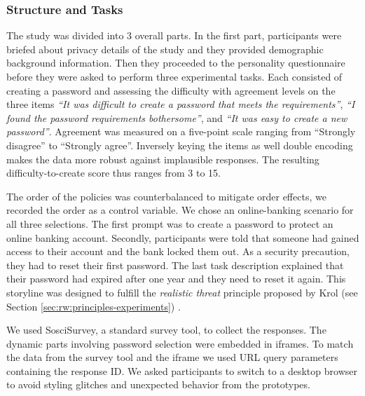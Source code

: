 \subsubsection{Structure and Tasks}
The study was divided into 3 overall parts. In the first part, participants were briefed about privacy details of the study and they provided demographic background information. Then they proceeded to the personality questionnaire before they were asked to perform three experimental tasks. Each consisted of creating a password and assessing the difficulty with agreement levels on the three items \textit{``It was difficult to create a password that meets the requirements''}, \textit{``I found the password requirements bothersome''}, and \textit{``It was easy to create a \textit{new} password''}. Agreement was measured on a five-point scale ranging from ``Strongly disagree'' to ``Strongly agree''. Inversely keying the items as well double encoding makes the data more robust against implausible responses. The resulting difficulty-to-create score thus ranges from 3 to 15.

The order of the policies was counterbalanced to mitigate order effects, we recorded the order as a control variable. We chose an online-banking scenario for all three selections. The first prompt was to create a password to protect an online banking account. Secondly, participants were told that someone had gained access to their account and the bank locked them out. As a security precaution, they had to reset their first password. The last task description explained that their password had expired after one year and they need to reset it again. This storyline was designed to fulfill the \textit{realistic threat} principle proposed by Krol \etal (see Section \ref{sec:rw:principles-experiments}) \cite{Krol2016ExperimentDesign}. 

We used SosciSurvey, a standard survey tool, to collect the responses. The dynamic parts involving password selection were embedded in iframes. To match the data from the survey tool and the iframe we used URL query parameters containing the response ID. We asked participants to switch to a desktop browser to avoid styling glitches and unexpected behavior from the prototypes. %

